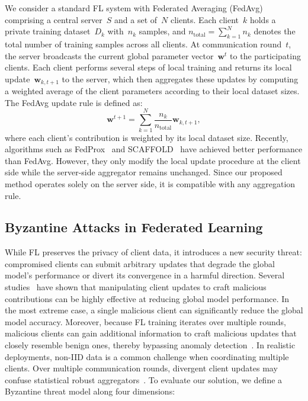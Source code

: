 \documentclass[journal]{IEEEtran}
\begin{document}
We consider a standard FL system with Federated Averaging (FedAvg)~\cite{mcmahan2017communication} comprising a central server~$S$ and a set of~$N$ clients. Each client~$k$ holds a private training dataset~$D_k$ with~$n_k$ samples, and $n_{\text{total}} = \sum_{k=1}^{N} n_k$ denotes the total number of training samples across all clients. At communication round~$t$, the server broadcasts the current global parameter vector~$\mathbf{w}^t$ to the participating clients. Each client performs several steps of local training and returns its local update~$\mathbf{w}_{k,t+1}$ to the server, which then aggregates these updates by computing a weighted average of the client parameters according to their local dataset sizes. The FedAvg update rule is defined as:
\begin{equation}
\mathbf{w}^{t+1} = \sum_{k=1}^{N} \frac{n_k}{n_{\text{total}}} \mathbf{w}_{k,t+1},
\label{eq:fedavg}
\end{equation}
where each client's contribution is weighted by its local dataset size. Recently, algorithms such as FedProx~\cite{li2020federated} and SCAFFOLD~\cite{karimireddy2021scaffold} have achieved better performance than FedAvg. However, they only modify the local update procedure at the client side while the server-side aggregator remains unchanged. Since our proposed method operates solely on the server side, it is compatible with any aggregation rule.

\subsection{Byzantine Attacks in Federated Learning}

While FL preserves the privacy of client data, it introduces a new security threat: compromised clients can submit arbitrary updates that degrade the global model's performance or divert its convergence in a harmful direction. Several studies~\cite{yin2018byzantine, shi2022challenges} have shown that manipulating client updates to craft malicious contributions can be highly effective at reducing global model performance. In the most extreme case, a single malicious client can significantly reduce the global model accuracy. Moreover, because FL training iterates over multiple rounds, malicious clients can gain additional information to craft malicious updates that closely resemble benign ones, thereby bypassing anomaly detection~\cite{baruch2019little}. In realistic deployments, non-IID data is a common challenge when coordinating multiple clients. Over multiple communication rounds, divergent client updates may confuse statistical robust aggregators~\cite{blanchard2017machine, yin2018byzantine}. To evaluate our solution, we define a Byzantine threat model along four dimensions:
\end{document}
